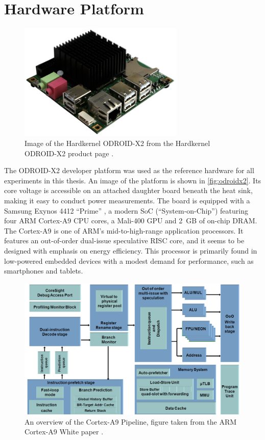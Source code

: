 \section{Hardware Platform}
\label{sec:hw}

\begin{figure}[bth]
    \centering
    \includegraphics[width=0.7\textwidth]{figs/odroid.jpg}
    \caption{Image of the Hardkernel ODROID-X2 from the Hardkernel ODROID-X2
    product page \cite{hardkernelodroidx2}.}
    \label{fig:odroidx2}
\end{figure}

The ODROID-X2 developer platform \cite{hardkernelodroidx2} was used as the
reference hardware for all experiments in this thesis. An image of the platform
is shown in \autoref{fig:odroidx2}. Its core voltage is accessible on an
attached daughter board beneath the heat sink, making it easy to conduct power
measurements. The board is equipped with a Samsung Exynos 4412 ``Prime''
\cite{exynossamsung}, a modern SoC (``System-on-Chip'') featuring four ARM
Cortex-A9 \cite{a9whitepaper} CPU cores, a Mali-400 GPU and 2~GB of on-chip
DRAM. The Cortex-A9 is one of ARM's mid-to-high-range application processors. It
features an out-of-order dual-issue speculative RISC core, and it seems to be
designed with emphasis on energy efficiency. This processor is primarily found
in low-powered embedded devices with a modest demand for performance, such as
smartphones and tablets.

\begin{figure}[bht]
    \centering
    \includegraphics[width=\textwidth]{figs/A9-Pipeline-hres.jpg}
    \caption{An overview of the Cortex-A9 Pipeline, figure taken from the ARM
    Cortex-A9 White paper \cite{a9whitepaper}.} \label{fig:a9arch}
\end{figure}

